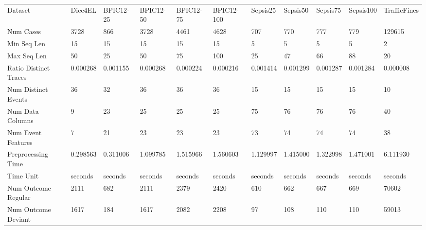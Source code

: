 \begin{tabular}{lllllllllll}
Dataset & Dice4EL & BPIC12-25 & BPIC12-50 & BPIC12-75 & BPIC12-100 & Sepsis25 & Sepsis50 & Sepsis75 & Sepsis100 & TrafficFines \\
Num Cases & 3728 & 866 & 3728 & 4461 & 4628 & 707 & 770 & 777 & 779 & 129615 \\
Min Seq Len & 15 & 15 & 15 & 15 & 15 & 5 & 5 & 5 & 5 & 2 \\
Max Seq Len & 50 & 25 & 50 & 75 & 100 & 25 & 47 & 66 & 88 & 20 \\
Ratio Distinct Traces & 0.000268 & 0.001155 & 0.000268 & 0.000224 & 0.000216 & 0.001414 & 0.001299 & 0.001287 & 0.001284 & 0.000008 \\
Num Distinct Events & 36 & 32 & 36 & 36 & 36 & 15 & 15 & 15 & 15 & 10 \\
Num Data Columns & 9 & 23 & 25 & 25 & 25 & 75 & 76 & 76 & 76 & 40 \\
Num Event Features & 7 & 21 & 23 & 23 & 23 & 73 & 74 & 74 & 74 & 38 \\
Preprocessing Time & 0.298563 & 0.311006 & 1.099785 & 1.515966 & 1.560603 & 1.129997 & 1.415000 & 1.322998 & 1.471001 & 6.111930 \\
Time Unit & seconds & seconds & seconds & seconds & seconds & seconds & seconds & seconds & seconds & seconds \\
Num Outcome Regular & 2111 & 682 & 2111 & 2379 & 2420 & 610 & 662 & 667 & 669 & 70602 \\
Num Outcome Deviant & 1617 & 184 & 1617 & 2082 & 2208 & 97 & 108 & 110 & 110 & 59013 \\
\end{tabular}
